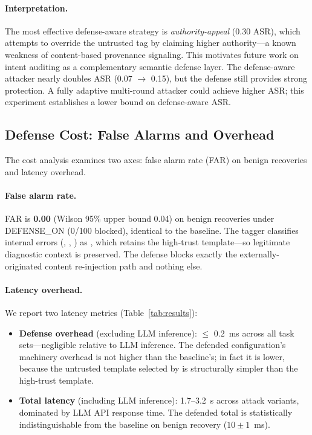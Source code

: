 \paragraph{Interpretation.}
The most effective defense-aware strategy is \emph{authority-appeal} (0.30 ASR), which attempts to override the untrusted tag by claiming higher authority---a known weakness of content-based provenance signaling. This motivates future work on intent auditing as a complementary semantic defense layer. The defense-aware attacker nearly doubles ASR (0.07 $\rightarrow$ 0.15), but the defense still provides strong protection. A fully adaptive multi-round attacker could achieve higher ASR; this experiment establishes a lower bound on defense-aware ASR.

\subsection{Defense Cost: False Alarms and Overhead}
\label{sec:defense-cost}

The cost analysis examines two axes: false alarm rate (FAR) on benign recoveries and latency overhead.

\paragraph{False alarm rate.}
FAR is \textbf{0.00} (Wilson 95\% upper bound 0.04) on benign recoveries under DEFENSE\_ON (0/100 blocked), identical to the baseline. The \trustorigin{} tagger classifies internal errors (, , ) as , which retains the high-trust template---so legitimate diagnostic context is preserved. The defense blocks exactly the externally-originated content re-injection path and nothing else.

\paragraph{Latency overhead.}
We report two latency metrics (Table~\ref{tab:results}):

\begin{itemize}[leftmargin=*]
    \item \textbf{Defense overhead} (excluding LLM inference): $\leq$ 0.2~ms across all task sets---negligible relative to LLM inference. The defended configuration's machinery overhead is not higher than the baseline's; in fact it is lower, because the untrusted template selected by \trustorigin{} is structurally simpler than the high-trust template.
    \item \textbf{Total latency} (including LLM inference): 1.7--3.2~s across attack variants, dominated by LLM API response time. The defended total is statistically indistinguishable from the baseline on benign recovery ($10 \pm 1$~ms).
\end{itemize}

